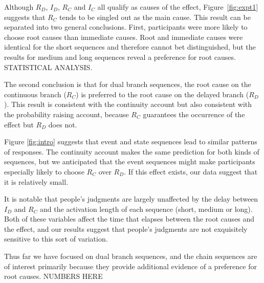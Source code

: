 \documentclass[10pt,letterpaper]{article}
\newcommand{\ev}[2]{$#1_#2$}
\begin{document}
Although \ev{R}{D}, \ev{I}{D}, \ev{R}{C} and \ev{I}{C} all qualify as causes of the effect, Figure~\ref{fig:expt1} suggests that \ev{R}{C} tends to be singled out as the main cause. This result can be separated into two general conclusions.  First,  participants were more likely to choose root causes than immediate causes. Root and immediate causes were identical for the short sequences and therefore cannot bet distinguished, but the results for medium and long sequences reveal a preference for root causes. STATISTICAL ANALYSIS. 

The second conclusion is that for dual branch sequences, the root cause on the continuous branch (\ev{R}{C}) is preferred to the root cause on the delayed branch (\ev{R}{D}). This result is consistent with the continuity account but also consistent with the probability raising account, because \ev{R}{C} guarantees the occurrence of the effect but \ev{R}{D} does not. 

Figure \ref{fig:intro} suggests that event and state sequences lead to similar patterns of responses. The continuity account makes the same prediction for both kinds of sequences, but we anticipated that the event sequences might make participants especially likely to choose \ev{R}{C} over \ev{R}{D}. If this effect exists, our data suggest that it is relatively small.

It is notable that people's judgments are largely unaffected by the delay between \ev{I}{D} and \ev{R}{C} and the activation length of each sequence (short, medium or long). Both of these variables affect the time that elapses between the root causes and the effect, and our results suggest that people's judgments are not exquisitely sensitive to this sort of variation.

Thus far we have focused on dual branch sequences, and the chain sequences are of interest primarily because they provide additional evidence of a preference for root causes.  NUMBERS HERE



\end{document}
